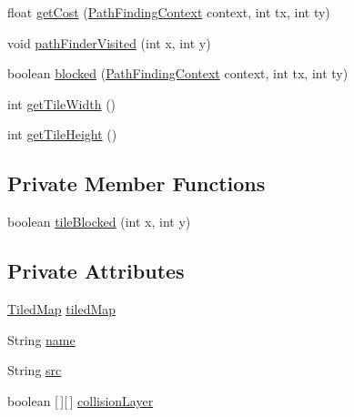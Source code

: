 \begin{DoxyCompactItemize}
\item 
float \mbox{\hyperlink{classentities_1_1_map_a251d9d490fc34a64fa2b67798c9a44a7}{get\+Cost}} (\mbox{\hyperlink{interfaceorg_1_1newdawn_1_1slick_1_1util_1_1pathfinding_1_1_path_finding_context}{Path\+Finding\+Context}} context, int tx, int ty)
\item 
void \mbox{\hyperlink{classentities_1_1_map_a0ad9c4406c9c9de0cfd6dfbf4acdd924}{path\+Finder\+Visited}} (int x, int y)
\item 
boolean \mbox{\hyperlink{classentities_1_1_map_a656ea4cf7c3477ccbc785b36a2cda9fe}{blocked}} (\mbox{\hyperlink{interfaceorg_1_1newdawn_1_1slick_1_1util_1_1pathfinding_1_1_path_finding_context}{Path\+Finding\+Context}} context, int tx, int ty)
\item 
int \mbox{\hyperlink{classentities_1_1_map_ada3d3610a5bdc025e1509583e0e36746}{get\+Tile\+Width}} ()
\item 
int \mbox{\hyperlink{classentities_1_1_map_a43c2e5888d77a6b400cc6dd2c9aa1769}{get\+Tile\+Height}} ()
\end{DoxyCompactItemize}
\subsection*{Private Member Functions}
\begin{DoxyCompactItemize}
\item 
boolean \mbox{\hyperlink{classentities_1_1_map_abcb73d4364f31f5dd9a251ab59942919}{tile\+Blocked}} (int x, int y)
\end{DoxyCompactItemize}
\subsection*{Private Attributes}
\begin{DoxyCompactItemize}
\item 
\mbox{\hyperlink{classorg_1_1newdawn_1_1slick_1_1tiled_1_1_tiled_map}{Tiled\+Map}} \mbox{\hyperlink{classentities_1_1_map_a94a743ccd80946422fcbdb5ba1cc966b}{tiled\+Map}}
\item 
String \mbox{\hyperlink{classentities_1_1_map_a969750cbb3acef375d33040e29be91f0}{name}}
\item 
String \mbox{\hyperlink{classentities_1_1_map_a15025d8ae6bb3627fb145ce75013b011}{src}}
\item 
boolean \mbox{[}$\,$\mbox{]}\mbox{[}$\,$\mbox{]} \mbox{\hyperlink{classentities_1_1_map_af7f17d81b7e3bd4e1897f8fb7f89f855}{collision\+Layer}}
\end{DoxyCompactItemize}


